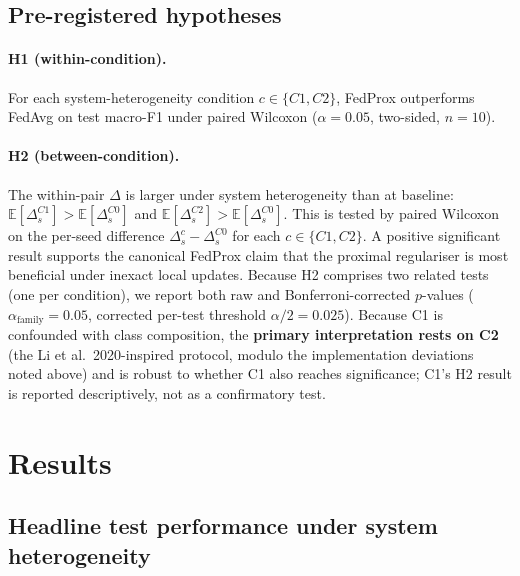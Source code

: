 \documentclass[11pt,a4paper]{article}
\begin{document}
\subsection{Pre-registered hypotheses}

\paragraph{H1 (within-condition).} For each system-heterogeneity
condition $c \in \{C1, C2\}$, FedProx outperforms FedAvg on test macro-F1
under paired Wilcoxon ($\alpha = 0.05$, two-sided, $n = 10$).

\paragraph{H2 (between-condition).} The within-pair $\Delta$ is larger
under system heterogeneity than at baseline:
$\mathbb{E}[\Delta_s^{C1}] > \mathbb{E}[\Delta_s^{C0}]$ and
$\mathbb{E}[\Delta_s^{C2}] > \mathbb{E}[\Delta_s^{C0}]$. This is tested
by paired Wilcoxon on the per-seed difference $\Delta_s^c - \Delta_s^{C0}$
for each $c \in \{C1, C2\}$. A positive significant result supports the
canonical FedProx claim that the proximal regulariser is most beneficial
under inexact local updates. Because H2 comprises two related tests (one
per condition), we report both raw and Bonferroni-corrected $p$-values
($\alpha_\text{family} = 0.05$, corrected per-test threshold
$\alpha / 2 = 0.025$). Because C1 is confounded with class composition,
the \textbf{primary interpretation rests on C2} (the Li et
al.\ 2020-inspired protocol, modulo the implementation deviations noted
above) and is robust to whether C1 also reaches significance; C1's
H2 result is reported descriptively, not as a confirmatory test.

\section{Results}

\subsection{Headline test performance under system heterogeneity}
\end{document}
